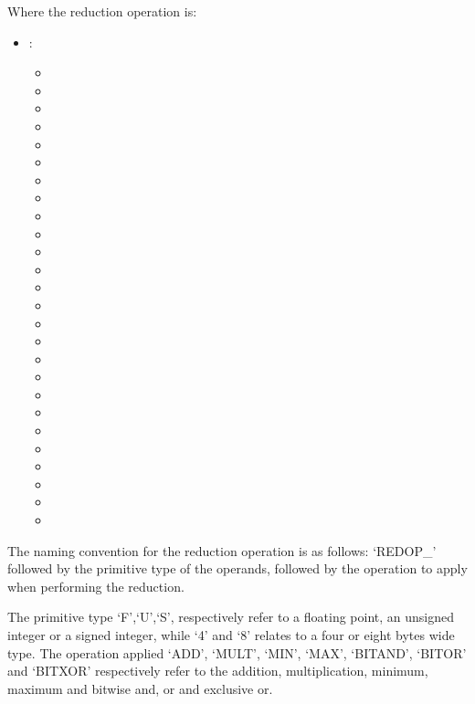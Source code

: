 Where the reduction operation is:
\begin{itemize}
\item {}:
\begin{itemize}
\item {}
\item {}
\item {}
\item {}
\item {}
\item {}
\item {}
\item {}
\item {}
\item {}
\item {}
\item {}
\item {}
\item {}
\item {}
\item {}
\item {}
\item {}
\item {}
\item {}
\item {}
\item {}
\item {}
\item {}
\item {}
\item {}
\end{itemize}
\end{itemize}

The naming convention for the reduction operation is as follows: `REDOP\_'
followed by the primitive type of the operands, followed by the operation
to apply when performing the reduction.

The primitive type `F',`U',`S', respectively refer to a floating point,
an unsigned integer or a signed integer, while `4' and `8' relates to a
four or eight bytes wide type.
The operation applied `ADD', `MULT', `MIN', `MAX', `BITAND', `BITOR' and `BITXOR'
respectively refer to the addition, multiplication, minimum, maximum
and bitwise and, or and exclusive or.